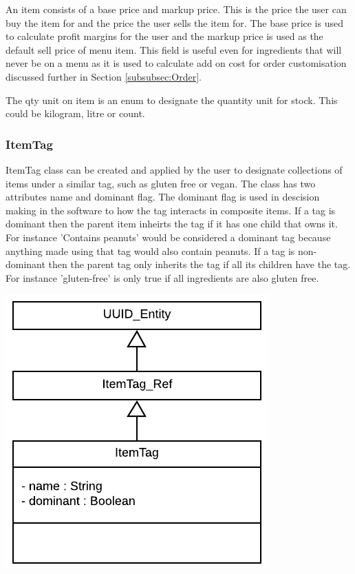 	An item consists of a base price and markup price. This is the price the user can buy the item for and the price the user sells the item for. The base price is used to calculate profit margins for the user and the markup price is used as the default sell price of menu item. This field is useful even for ingredients that will never be on a menu as it is used to calculate add on cost for order customisation discussed further in Section \ref{subsubsec:Order}.
	
	The qty unit on item is an enum to designate the quantity unit for stock. This could be kilogram, litre or count.
	

\subsubsection{ItemTag}

	\begin{minipage}[t]{.6\linewidth}
		ItemTag class can be created and applied by the user to designate collections of items under a similar tag, such as gluten free or vegan. The class has two attributes name and dominant flag. The dominant flag is used in descision making in the software to how the tag interacts in composite items. If a tag is dominant then the parent item inheirts the tag if it has one child that owns it. For instance 'Contains peanuts' would be considered a dominant tag because anything made using that tag would also contain peanuts. If a tag is non-dominant then the parent tag only inherits the tag if all its children have the tag. For instance 'gluten-free' is only true if all ingredients are also gluten free. 
		
	\end{minipage}
	\hspace{0.02\linewidth}
	\begin{minipage}[t][][b]{.3\linewidth}
		\includegraphics[width=\linewidth]{images/data_model/tag.png}
	\end{minipage}


